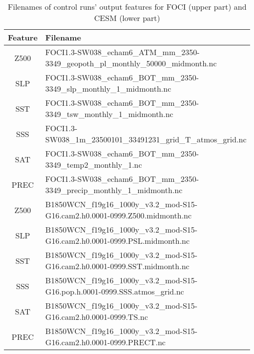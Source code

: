 \documentclass{CUP-JNL-DTM}%
\theoremstyle{definition}
\numberwithin{equation}{section}
\begin{document}
\begin{table}
\caption{Filenames of control runs' output features for FOCI (upper part) and CESM (lower part)} \label{tab:filenames}

\begin{center}
\begin{tabular}{|c|l|}
\hline
\textbf{Feature} & \textbf{Filename} \\
\hline
Z500 & {\small FOCI1.3-SW038\_echam6\_ATM\_mm\_2350-3349\_geopoth\_pl\_monthly\_50000\_midmonth.nc} \\
SLP & {\small FOCI1.3-SW038\_echam6\_BOT\_mm\_2350-3349\_slp\_monthly\_1\_midmonth.nc} \\
SST & {\small FOCI1.3-SW038\_echam6\_BOT\_mm\_2350-3349\_tsw\_monthly\_1\_midmonth.nc} \\
SSS & {\small FOCI1.3-SW038\_1m\_23500101\_33491231\_grid\_T\_atmos\_grid.nc} \\
SAT & {\small FOCI1.3-SW038\_echam6\_BOT\_mm\_2350-3349\_temp2\_monthly\_1.nc} \\
PREC & {\small FOCI1.3-SW038\_echam6\_BOT\_mm\_2350-3349\_precip\_monthly\_1\_midmonth.nc} \\
\hline
Z500 & {\small B1850WCN\_f19g16\_1000y\_v3.2\_mod-S15-G16.cam2.h0.0001-0999.Z500.midmonth.nc} \\
SLP & {\small B1850WCN\_f19g16\_1000y\_v3.2\_mod-S15-G16.cam2.h0.0001-0999.PSL.midmonth.nc} \\
SST & {\small B1850WCN\_f19g16\_1000y\_v3.2\_mod-S15-G16.cam2.h0.0001-0999.SST.midmonth.nc} \\
SSS & {\small B1850WCN\_f19g16\_1000y\_v3.2\_mod-S15-G16.pop.h.0001-0999.SSS.atmos\_grid.nc} \\
SAT & {\small B1850WCN\_f19g16\_1000y\_v3.2\_mod-S15-G16.cam2.h0.0001-0999.TS.nc} \\
PREC & {\small B1850WCN\_f19g16\_1000y\_v3.2\_mod-S15-G16.cam2.h0.0001-0999.PRECT.nc} \\
\hline

\end{tabular}
\end{center}
\end{table}
\end{document}
